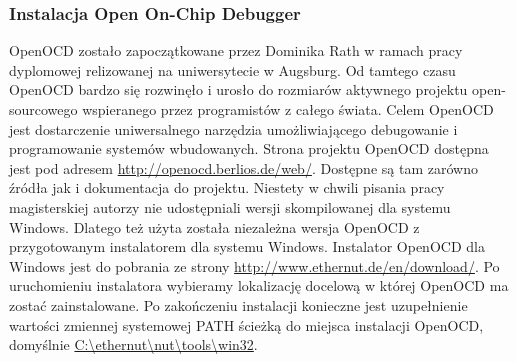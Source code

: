 \subsubsection{Instalacja Open On-Chip Debugger}
OpenOCD zostało zapoczątkowane przez Dominika Rath w ramach pracy dyplomowej
relizowanej na uniwersytecie w Augsburg. Od tamtego czasu OpenOCD bardzo się
rozwinęło i urosło do rozmiarów aktywnego projektu open-sourcowego wspieranego
przez programistów z całego świata. Celem OpenOCD jest dostarczenie
uniwersalnego narzędzia umożliwiającego debugowanie i programowanie systemów
wbudowanych. \newline \newline
Strona projektu OpenOCD dostępna jest pod adresem
\url{http://openocd.berlios.de/web/}. Dostępne są tam zarówno źródła jak i
dokumentacja do projektu. Niestety w chwili pisania pracy magisterskiej autorzy
nie udostępniali wersji skompilowanej dla systemu Windows. Dlatego też użyta
została niezależna wersja OpenOCD z przygotowanym instalatorem dla systemu
Windows. Instalator OpenOCD dla Windows jest do pobrania ze strony
\url{http://www.ethernut.de/en/download/}. Po uruchomieniu instalatora wybieramy
lokalizację docelową w której OpenOCD ma zostać zainstalowane. Po zakończeniu
instalacji konieczne jest uzupełnienie wartości zmiennej systemowej PATH ścieżką
do miejsca instalacji OpenOCD, domyślnie \url{C:\ethernut\nut\tools\win32}.